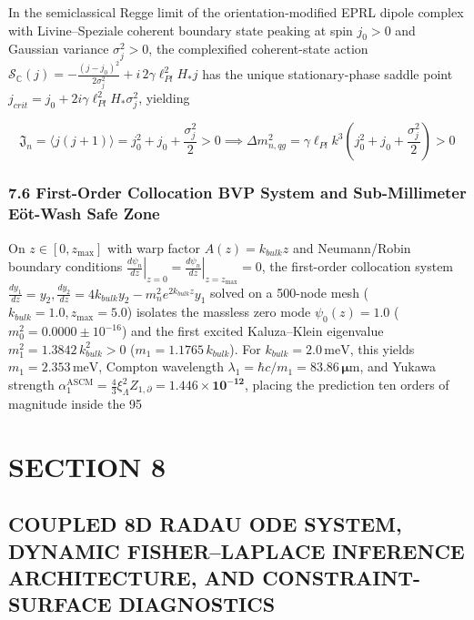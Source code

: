 \documentclass[aps,prd,onecolumn,superscriptaddress,nofootinbib,longbibliography,10pt]{revtex4-2}
\begin{document}
{{In the semiclassical Regge limit of the orientation-modified EPRL dipole complex with Livine--Speziale coherent boundary state peaking at spin \(j_0 > 0\) and Gaussian variance \(\sigma_j^2 > 0\), the complexified coherent-state action \(\mathcal{S}_{\mathbb{C}}(j) = -\frac{(j - j_0)^2}{2\sigma_j^2} + i\,2\gamma\ell_{Pl}^2 H_* j\) has the unique stationary-phase saddle point \(j_{crit} = j_0 + 2i\gamma\ell_{Pl}^2 H_* \sigma_j^2\), yielding


\[\mathfrak{J}_n = \langle j(j+1)\rangle = j_0^2 + j_0 + \frac{\sigma_j^2}{2} > 0 \implies \Delta m_{n,qg}^2 = \gamma\ell_{Pl} k^3\left( j_0^2 + j_0 + \frac{\sigma_j^2}{2} \right) > 0\]


\subsubsection*{7.6 First-Order Collocation BVP System and Sub-Millimeter E\"ot-Wash Safe Zone}

On \(z \in [0, z_{\max}]\) with warp factor \(A(z) = k_{bulk}z\) and Neumann/Robin boundary conditions \(\left.\frac{d\psi_n}{dz}\right|_{z=0} = \left.\frac{d\psi_n}{dz}\right|_{z=z_{\max}} = 0\), the first-order collocation system \(\frac{dy_1}{dz} = y_2, \frac{dy_2}{dz} = 4k_{bulk}y_2 - m_n^2 e^{2k_{bulk}z}y_1\) solved on a 500-node mesh (\(k_{bulk} = 1.0, z_{\max} = 5.0\)) isolates the massless zero mode \(\psi_0(z) = 1.0\) (\(m_0^2 = 0.0000 \pm 10^{-16}\)) and the first excited Kaluza--Klein eigenvalue \(m_1^2 = 1.3842\,k_{bulk}^2 > 0\) (\(m_1 = 1.1765\,k_{bulk}\)). For \(k_{bulk} = 2.0\,\mathrm{meV}\), this yields \(m_1 = 2.353\,\mathrm{meV}\), Compton wavelength \(\lambda_1 = \hbar c/m_1 = \mathbf{83.86\,\mu\mathrm{m}}\), and Yukawa strength \(\alpha_1^{\mathrm{ASCM}} = \frac{4}{3}\xi_\Lambda^2 Z_{1,\partial} = \mathbf{1.446 \times 10^{-12}}\), placing the prediction ten orders of magnitude inside the 95%




  
\section*{SECTION 8}

  
\subsection*{COUPLED 8D RADAU ODE SYSTEM, DYNAMIC FISHER–LAPLACE INFERENCE ARCHITECTURE, AND CONSTRAINT-SURFACE DIAGNOSTICS}

}}
\end{document}
